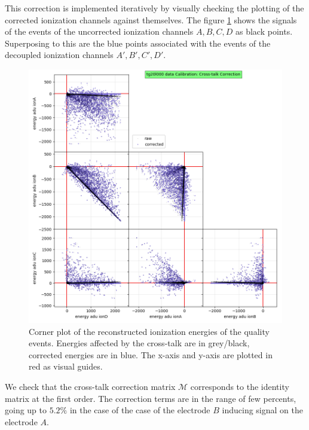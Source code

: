 This correction is implemented iteratively by visually checking the plotting of the corrected ionization channels against themselves. The figure \ref{fig:crosstalk-correction} shows the signals of the events of the uncorrected ionization channels $A, B, C, D$ as black points. Superposing to this are the blue points associated with the events of the decoupled ionization channels $A', B', C', D'$.

\begin{figure}
\centering
\includegraphics[width=\linewidth,]{Figures/Neutron/crosstalk_correction.png}
\caption{Corner plot of the reconstructed ionization energies of the quality events. Energies affected by the cross-talk are in grey/black, corrected energies are in blue. The x-axis and y-axis are plotted in red as visual guides.}
\label{fig:crosstalk-correction}
\end{figure}

We check that the cross-talk correction matrix $\mathcal{M}$ corresponds to the identity matrix at the first order. The correction terms are in the range of few percents, going up to $5.2\%$ in the case of the case of the electrode $B$ inducing signal on the electrode $A$.


